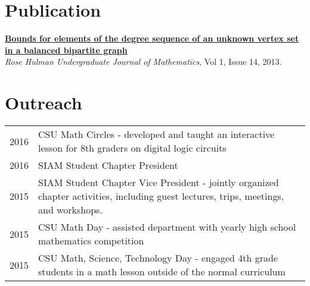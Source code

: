 \documentclass[letterpaper]{pine-resume} %
\begin{document}
\begin{minipage}[t]{0.66\textwidth}


\section{Publication}

\href{https://www.rose-hulman.edu/mathjournal/archives/2013/vol14-n1/paper11/v14n1-11pd.pdf}{\textbf{Bounds for elements of the degree sequence of an unknown vertex set in a balanced bipartite graph}} \\
\emph{Rose Hulman Undergraduate Journal of Mathematics}, Vol 1, Issue 14, 2013. \\

\sectionspace %


\section{Outreach}

\begin{tabular}{p{1cm} p{11.5cm}}
2016 & CSU Math Circles - developed and taught an interactive lesson for 8th graders on digital logic circuits\\
2016 & SIAM Student Chapter President\\
2015 & SIAM Student Chapter Vice President - jointly organized chapter activities, including guest lectures, trips, meetings, and workshops. \\
2015 & CSU Math Day - assisted department with yearly high school mathematics competition\\
2015 & CSU Math, Science, Technology Day - engaged 4th grade students in a math lesson outside of the normal curriculum\\
\end{tabular}

\sectionspace %

\end{minipage} %

\end{document}
